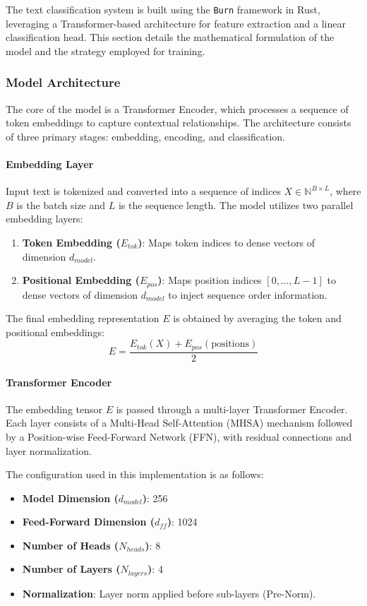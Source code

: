 \documentclass{ieeeaccess}
\begin{document}
The text classification system is built using the \texttt{Burn} framework in Rust, leveraging a Transformer-based architecture for feature extraction and a linear classification head. This section details the mathematical formulation of the model and the strategy employed for training.

\subsubsection{Model Architecture}
The core of the model is a Transformer Encoder, which processes a sequence of token embeddings to capture contextual relationships. The architecture consists of three primary stages: embedding, encoding, and classification.

\paragraph{Embedding Layer}
Input text is tokenized and converted into a sequence of indices $X \in \mathbb{N}^{B \times L}$, where $B$ is the batch size and $L$ is the sequence length. The model utilizes two parallel embedding layers:
\begin{enumerate}
    \item \textbf{Token Embedding ($E_{tok}$)}: Maps token indices to dense vectors of dimension $d_{model}$.
    \item \textbf{Positional Embedding ($E_{pos}$)}: Maps position indices $[0, \dots, L-1]$ to dense vectors of dimension $d_{model}$ to inject sequence order information.
\end{enumerate}

The final embedding representation $E$ is obtained by averaging the token and positional embeddings:
\begin{equation}
    E = \frac{E_{tok}(X) + E_{pos}(\text{positions})}{2}
\end{equation}

\paragraph{Transformer Encoder}
The embedding tensor $E$ is passed through a multi-layer Transformer Encoder. Each layer consists of a Multi-Head Self-Attention (MHSA) mechanism followed by a Position-wise Feed-Forward Network (FFN), with residual connections and layer normalization. 

The configuration used in this implementation is as follows:
\begin{itemize}
    \item \textbf{Model Dimension ($d_{model}$)}: 256
    \item \textbf{Feed-Forward Dimension ($d_{ff}$)}: 1024
    \item \textbf{Number of Heads ($N_{heads}$)}: 8
    \item \textbf{Number of Layers ($N_{layers}$)}: 4
    \item \textbf{Normalization}: Layer norm applied before sub-layers (Pre-Norm).
\end{itemize}
\end{document}
